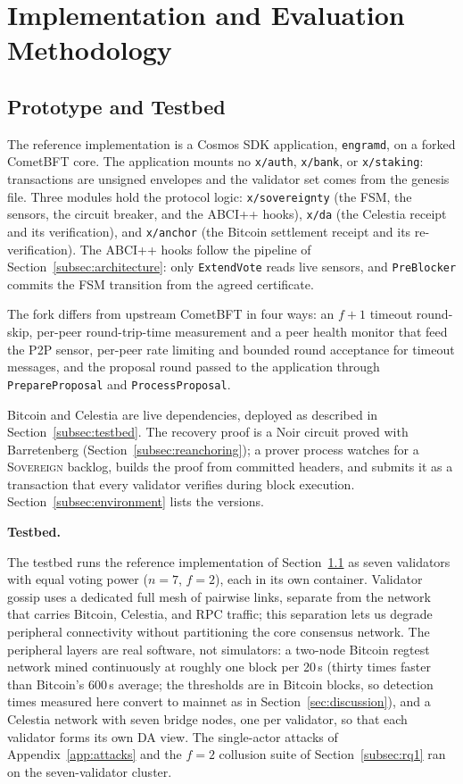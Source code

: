 \section{Implementation and Evaluation Methodology}
\label{sec:setup}

\subsection{Prototype and Testbed}
\label{subsec:implementation}

The reference implementation is a Cosmos SDK application, \texttt{engramd},
on a forked CometBFT core. The application mounts no \texttt{x/auth},
\texttt{x/bank}, or \texttt{x/staking}: transactions are unsigned envelopes
and the validator set comes from the genesis file. Three modules hold the
protocol logic: \texttt{x/sovereignty} (the FSM, the sensors, the circuit
breaker, and the ABCI++ hooks), \texttt{x/da} (the Celestia receipt and its
verification), and \texttt{x/anchor} (the Bitcoin settlement receipt and its
re-verification). The ABCI++ hooks follow the pipeline of
Section~\ref{subsec:architecture}: only \texttt{ExtendVote} reads live
sensors, and \texttt{PreBlocker} commits the FSM transition from the agreed
certificate.

The fork differs from upstream CometBFT in four ways: an $f{+}1$ timeout
round-skip, per-peer round-trip-time measurement and a peer health monitor
that feed the P2P sensor, per-peer rate limiting and bounded round acceptance
for timeout messages, and the proposal round passed to the application
through \texttt{PrepareProposal} and \texttt{ProcessProposal}.

Bitcoin and Celestia are live dependencies, deployed as described in
Section~\ref{subsec:testbed}. The recovery proof is a Noir circuit proved with
Barretenberg (Section~\ref{subsec:reanchoring}); a prover process watches for
a \textsc{Sovereign} backlog, builds the proof from committed headers, and
submits it as a transaction that every validator verifies during block
execution. Section~\ref{subsec:environment} lists the versions.

\textbf{Testbed.}\label{subsec:testbed}

The testbed runs the reference implementation of Section~\ref{subsec:implementation}
as seven validators with equal voting power ($n{=}7$, $f{=}2$), each in its
own container. Validator gossip uses a
dedicated full mesh of pairwise links, separate from the network that
carries Bitcoin, Celestia, and RPC traffic; this separation lets us degrade
peripheral connectivity without partitioning the core consensus network.
The peripheral layers are real software, not simulators: a two-node Bitcoin
regtest network mined continuously at roughly one block per 20\,s (thirty times faster than Bitcoin's 600\,s average; the thresholds are in Bitcoin blocks, so detection times measured here convert to mainnet as in Section~\ref{sec:discussion}), and a
Celestia network with seven bridge nodes, one per validator, so that each
validator forms its own DA view. The single-actor attacks of Appendix~\ref{app:attacks} and the $f{=}2$ collusion
suite of Section~\ref{subsec:rq1} ran on the seven-validator cluster.


